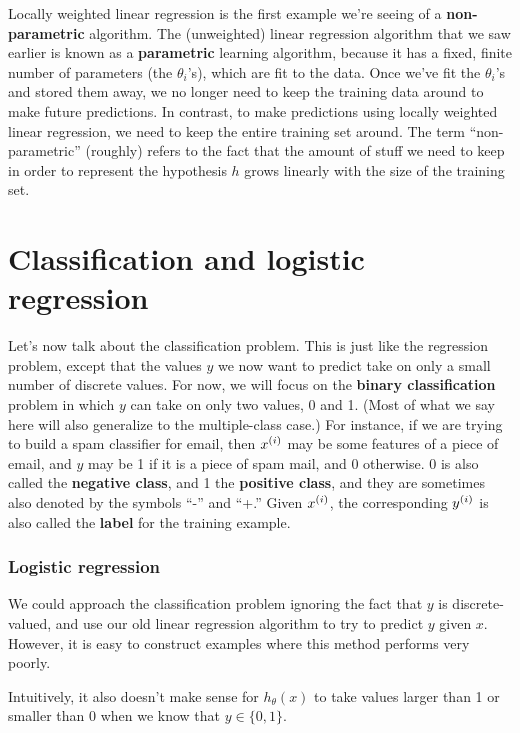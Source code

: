 \documentclass{article}
\begin{document}
Locally weighted linear regression is the first example we're seeing
of a {\bf non-parametric} algorithm.  The (unweighted) linear regression
algorithm that we saw earlier is known as a {\bf parametric} learning
algorithm, because it has a fixed, finite number of parameters
(the $\theta_i$'s), which are
fit to the data.  Once we've fit the $\theta_i$'s and stored them away, we no
longer need to keep the training data around to make future predictions.
In contrast, to make predictions using locally weighted linear regression,
we need to keep the entire training set around.  The term ``non-parametric''
(roughly) refers to the fact that the amount of stuff we need to keep
in order to represent the hypothesis $h$
grows linearly with the size of the training set.

\part{Classification and logistic regression}

Let's now talk about the classification problem.  This is just like
the regression problem, except that the values $y$ we now want to
predict take on only a small number of discrete values.  For now,
we will focus on the {\bf binary classification} problem in
which $y$ can take on only two values, 0 and 1.
(Most of what we
say here will also generalize to the multiple-class case.)
For instance, if we are trying to build a spam classifier for email,
then ${x^{(i)}}$ may be some features of a piece of email, and $y$ may
be 1 if it is a piece of spam mail, and 0 otherwise.
0 is also called the {\bf negative class}, and
1 the {\bf positive class}, and they are sometimes also denoted
by the symbols ``-'' and ``+.'' Given ${x^{(i)}}$, the corresponding
${y^{(i)}}$ is also called the {\bf label} for the training example.

\section{Logistic regression}

We could approach the classification problem ignoring the fact that
$y$ is discrete-valued, and use our old linear regression algorithm to
try to predict $y$ given $x$. However, it is easy to construct examples
where this method performs very poorly.

Intuitively, it also doesn't make sense for $h_\theta(x)$ to take
values larger than 1 or smaller than 0 when we know that $y \in \{0,1\}$.
\end{document}
